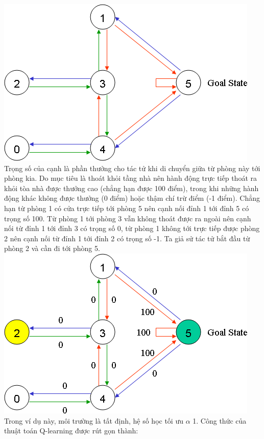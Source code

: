 \documentclass[14pt,a4paper,oneside]{report}		%
\begin{document}
\includegraphics[width=\textwidth,height=\textheight,keepaspectratio]{2.png}
\\
Trọng số của cạnh là phần thưởng cho tác tử khi di chuyển giữa từ phòng này tới phòng kia. Do mục tiêu là thoát khỏi tầng nhà nên hành động trực tiếp thoát ra khỏi tòa nhà được thưởng cao (chẳng hạn được 100 điểm), trong khi những hành động khác không được thưởng (0 điểm) hoặc thậm chí trừ điểm (-1 điểm). Chẳng hạn từ phòng 1 có cửa trực tiếp tới phòng 5 nên cạnh nối đỉnh 1 tới đỉnh 5 có trọng số 100. Từ phòng 1 tới phòng 3 vẫn không thoát được ra ngoài nên cạnh nối từ đỉnh 1 tới đỉnh 3 có trọng số 0, từ phòng 1 không tới trực tiếp được phòng 2 nên cạnh nối từ đỉnh 1 tới đỉnh 2 có trọng số -1. Ta giả sử tác tử bắt đầu từ phòng 2 và cần đi tới phòng 5.\\
\includegraphics[width=\textwidth,height=\textheight,keepaspectratio]{3.png}
\\
Trong ví dụ này, môi trường là tất định, hệ số học tối ưu $\alpha$ 1. Công thức của thuật toán Q-learning được rút gọn thành:
\end{document}
